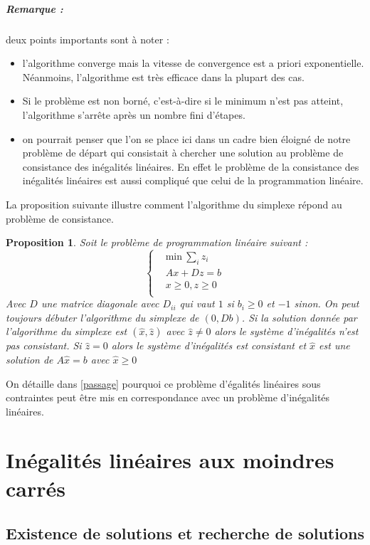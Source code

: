 \documentclass[10pt,a4paper]{article}
\newtheorem{prop}{Proposition}
\begin{document}
\subparagraph{Remarque :} deux points importants sont à noter :
\begin{itemize}
\item l'algorithme converge mais la vitesse de convergence est a priori exponentielle. Néanmoins, l'algorithme est très efficace dans la plupart des cas.
\item Si le problème est non borné, c'est-à-dire si le minimum n'est pas atteint, l'algorithme s'arrête après un nombre fini d'étapes.
\item on pourrait penser que l'on se place ici dans un cadre bien éloigné de notre problème de départ qui consistait à chercher une solution au problème de consistance des inégalités linéaires. En effet le problème de la consistance des inégalités linéaires est aussi compliqué que celui de la programmation linéaire.
\end{itemize}
La proposition suivante illustre comment l'algorithme du simplexe répond au problème de consistance.

\begin{prop}
Soit le problème de programmation linéaire suivant :
\begin{equation}
\left\lbrace
\begin{aligned}
& \text{min} \ \underset{i}{\sum}z_i\\
& Ax+Dz=b\\
& x \ge 0, z \ge 0\\
\end{aligned}
\right.
\end{equation}
Avec $D$ une matrice diagonale avec $D_{ii}$ qui vaut $1$ si $b_i \ge 0$ et $-1$ sinon. On peut toujours débuter l'algorithme du simplexe de $(0,Db)$. Si la solution donnée par l'algorithme du simplexe est $(\hat{x},\hat{z})$ avec $\hat{z} \neq 0$ alors le système d'inégalités n'est pas consistant. Si $\hat{z}=0$ alors le système d'inégalités est consistant et $\hat{x}$ est une solution de $A \hat{x} = b$ avec $\hat{x} \ge 0$
\end{prop}

On détaille dans \ref{passage} pourquoi ce problème d'égalités linéaires sous contraintes peut être mis en correspondance avec un problème d'inégalités linéaires.
\section{Inégalités linéaires aux moindres carrés}

\subsection{Existence de solutions et recherche de solutions}
\end{document}
